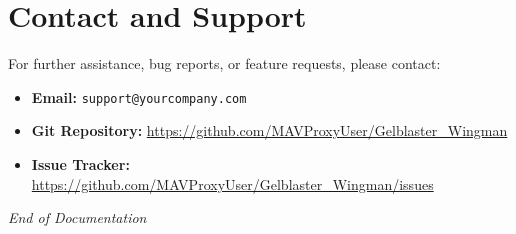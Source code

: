 \documentclass[12pt]{article}
\begin{document}
\section{Contact and Support}
For further assistance, bug reports, or feature requests, please contact:
\begin{itemize}[leftmargin=*, label={--}]
    \item \textbf{Email:} \texttt{support@yourcompany.com}
    \item \textbf{Git Repository:} \url{https://github.com/MAVProxyUser/Gelblaster_Wingman}
    \item \textbf{Issue Tracker:} \url{https://github.com/MAVProxyUser/Gelblaster_Wingman/issues}
\end{itemize}

\bigskip
\noindent\textit{End of Documentation}
\end{document}

